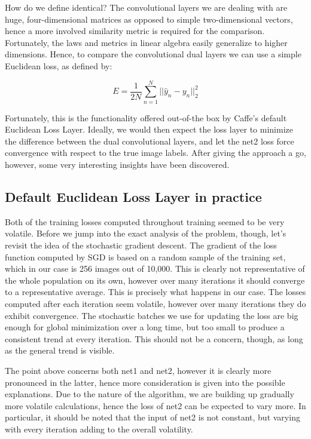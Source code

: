 \documentclass[a4paper, 12pt]{article}
\numberwithin{equation}{section}
\begin{document}
	How do we define identical? The convolutional layers we are dealing with are huge, four-dimensional matrices as opposed to simple two-dimensional vectors, hence a more involved similarity metric is required for the comparison. Fortunately, the laws and metrics in linear algebra easily generalize to higher dimensions. Hence, to compare the convolutional dual layers we can use a simple Euclidean loss, as defined by:

	\begin{equation} \label{euclidean_loss_formula}
		E=\frac{1}{2N} \sum_{n=1}^{N} ||\hat{y}_n-y_n||^2_2
	\end{equation}

	Fortunately, this is the functionality offered out-of-the box by Caffe's default Euclidean Loss Layer. Ideally, we would then expect the loss layer to minimize the difference between the dual convolutional layers, and let the net2 loss force convergence with respect to the true image labels. After giving the approach a go, however, some very interesting insights have been discovered.

	\subsection{Default Euclidean Loss Layer in practice}

	Both of the training losses computed throughout training seemed to be very volatile. Before we jump into the exact analysis of the problem, though, let's revisit the idea of the stochastic gradient descent. The gradient of the loss function computed by SGD is based on a random sample of the training set, which in our case is 256 images out of 10,000. This is clearly not representative of the whole population on its own, however over many iterations it should converge to a representative average. This is precisely what happens in our case. The losses computed after each iteration seem volatile, however over many iterations they do exhibit convergence. The stochastic batches we use for updating the loss are big enough for global minimization over a long time, but too small to produce a consistent trend at every iteration. This should not be a concern, though, as long as the general trend is visible.

	The point above concerns both net1 and net2, however it is clearly more pronounced in the latter, hence more consideration is given into the possible explanations. Due to the nature of the algorithm, we are building up gradually more volatile calculations, hence the loss of net2 can be expected to vary more. In particular, it should be noted that the input of net2 is not constant, but varying with every iteration adding to the overall volatility.
\end{document}
